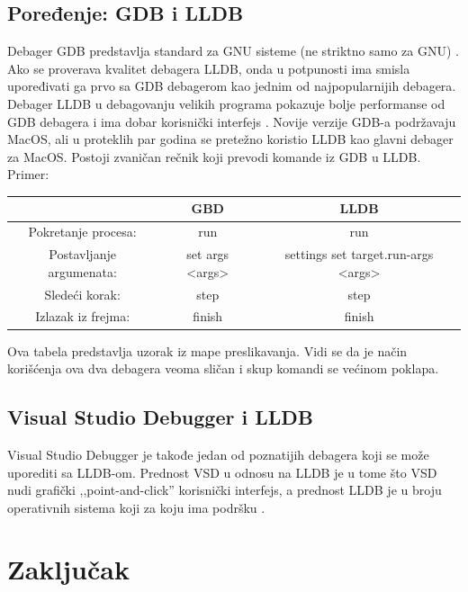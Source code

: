 \documentclass[a4paper]{article}
\begin{document}
\subsection{Poređenje: GDB i LLDB}
\label{subsec: GDB i LLDB}

Debager GDB predstavlja standard za GNU sisteme (ne striktno samo za GNU) \cite{gdb}. Ako se proverava kvalitet debagera LLDB, onda u potpunosti ima smisla upoređivati ga prvo sa GDB debagerom kao jednim od najpopularnijih debagera. Debager LLDB u debagovanju velikih programa pokazuje bolje performanse od GDB debagera i ima dobar korisnički interfejs \cite{lldb_project_blog}. Novije verzije GDB-a podržavaju MacOS, ali u proteklih par godina se pretežno koristio LLDB kao glavni debager za MacOS. Postoji zvaničan rečnik koji prevodi komande iz GDB u LLDB. \cite {lldb_to_gdb_map} Primer:

\begin{center}
	\begin{tabular}{c | c | c}
		& GBD & LLDB \\ 
		\hline
		Pokretanje procesa: & run & run \\ 
		\hline 
		Postavljanje argumenata: &set args <args>
		& settings set target.run-args <args> \\
		\hline
		Sledeći korak: & step & step \\
		\hline
		Izlazak iz frejma: & finish & finish
	\end{tabular}
\end{center}

\indent Ova tabela predstavlja uzorak iz mape preslikavanja. Vidi se da je način korišćenja ova dva debagera veoma sličan i skup komandi se većinom poklapa. 

\subsection{Visual Studio Debugger i LLDB}
\label{subsec: Visual Studio Debugger i LLDB}


Visual Studio Debugger je takođe jedan od poznatijih debagera koji se može uporediti sa LLDB-om. Prednost VSD u odnosu na LLDB je u tome što VSD nudi grafički ,,point-and-click'' korisnički interfejs, a prednost LLDB je u broju operativnih sistema koji za koju ima podršku \cite{vsd}.
\section{Zaključak}
\label{sec:zakljucak}
\end{document}
